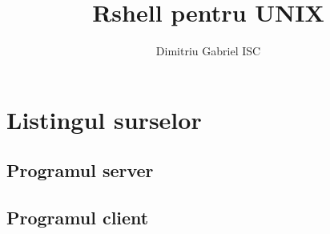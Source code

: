 \documentclass {report}
\title{Rshell pentru UNIX}
\author{Dimitriu Gabriel ISC}
\date{}
\begin{document}
\maketitle
\tableofcontents


\chapter{Listingul surselor}
\section{Programul server}

\section{Programul client}

\end{document}
